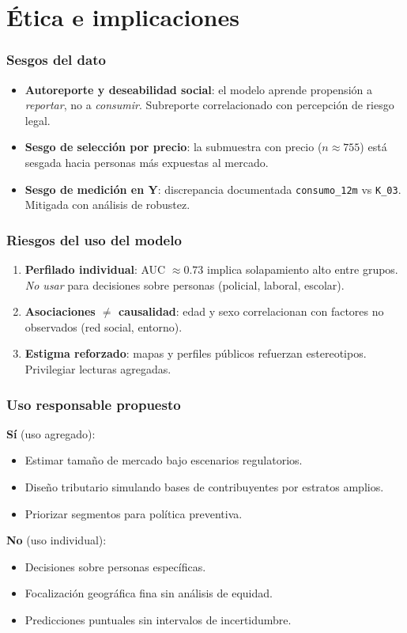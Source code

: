 \section{Ética e implicaciones}

\begin{frame}
\frametitle{Sesgos del dato}
\begin{itemize}
    \item \textbf{Autoreporte y deseabilidad social}: el modelo aprende propensión a \emph{reportar}, no a \emph{consumir}. Subreporte correlacionado con percepción de riesgo legal.
    \item \textbf{Sesgo de selección por precio}: la submuestra con precio ($n\approx 755$) está sesgada hacia personas más expuestas al mercado.
    \item \textbf{Sesgo de medición en Y}: discrepancia documentada \texttt{consumo\_12m} vs \texttt{K\_03}. Mitigada con análisis de robustez.
\end{itemize}
\end{frame}

\begin{frame}
\frametitle{Riesgos del uso del modelo}
\begin{enumerate}
    \item \textbf{Perfilado individual}: AUC $\approx 0.73$ implica solapamiento alto entre grupos. \textit{No usar} para decisiones sobre personas (policial, laboral, escolar).
    \item \textbf{Asociaciones $\neq$ causalidad}: edad y sexo correlacionan con factores no observados (red social, entorno).
    \item \textbf{Estigma reforzado}: mapas y perfiles públicos refuerzan estereotipos. Privilegiar lecturas agregadas.
\end{enumerate}
\end{frame}

\begin{frame}
\frametitle{Uso responsable propuesto}
\textbf{Sí} (uso agregado):
\begin{itemize}
    \item Estimar tamaño de mercado bajo escenarios regulatorios.
    \item Diseño tributario simulando bases de contribuyentes por estratos amplios.
    \item Priorizar segmentos para política preventiva.
\end{itemize}
\vspace{0.3cm}
\textbf{No} (uso individual):
\begin{itemize}
    \item Decisiones sobre personas específicas.
    \item Focalización geográfica fina sin análisis de equidad.
    \item Predicciones puntuales sin intervalos de incertidumbre.
\end{itemize}
\end{frame}


